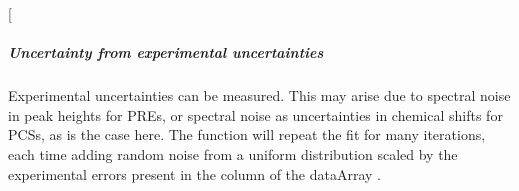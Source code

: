 \documentclass[a4paper,10pt,english,openany,oneside]{sphinxmanual}
\begin{document}
%
\begin{sphinxVerbatim}[commandchars=\\\{\}]
            
            
               
               
               
                  
                  
                 
               
              
                   
                 
                 
                
\end{sphinxVerbatim}

 {[}\sphinxcode{\sphinxupquote{models.png}}{]}

\noindent{}


\subparagraph{Uncertainty from experimental uncertainties}
\label{\detokenize{examples/pcs_fit_uncertainty:uncertainty-from-experimental-uncertainties}}
Experimental uncertainties can be measured. This may arise due to spectral noise in peak heights for PREs, or spectral noise as uncertainties in chemical shifts for PCSs, as is the case here. The function {\hyperref[\detokenize{reference/generated/paramagpy.fit.fit_error_monte_carlo:paramagpy.fit.fit_error_monte_carlo}]{}} will repeat the fit for many iterations, each time adding random noise from a uniform distribution scaled by the experimental errors present in the  column of the dataArray .
\end{document}
